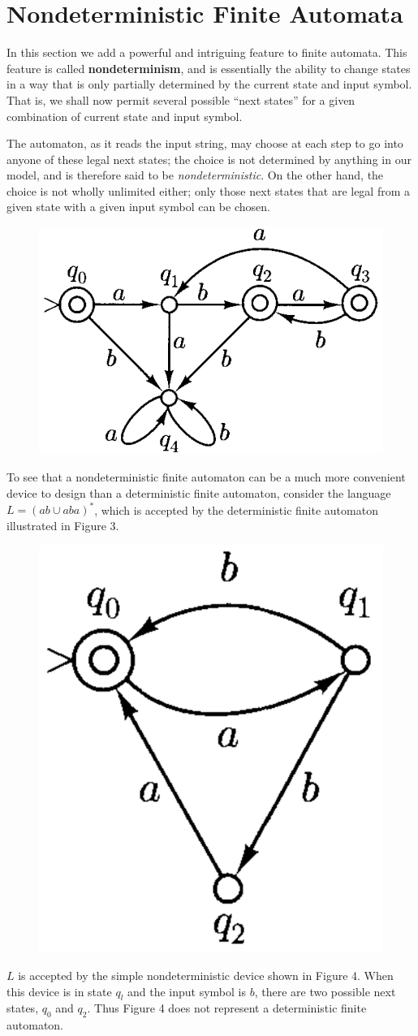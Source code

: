 \section{Nondeterministic Finite Automata}

In this section we add a powerful and intriguing feature to finite automata.
This feature is called \textbf{nondeterminism}, and is essentially the ability to change states in a way that is only partially determined by the current state and input symbol. That is, we shall now permit several possible ``next states'' for a given combination of current state and input symbol. 

The automaton, as it reads the input string, may choose at each step to go into anyone of these legal next states; the choice is not determined by anything in our model, and is therefore said to be \textit{nondeterministic}. On the other hand, the choice is not wholly unlimited either; only those next states that are legal from a given state with a given input symbol can be chosen. 

\newpage

\begin{figure}[ht!]
  \centering
  \includegraphics[width=.3\textwidth]{img/Fig2.4.png}
  \caption{}
\end{figure}

To see that a nondeterministic finite automaton can be a much more convenient device to design than a deterministic finite automaton, consider the language $L = (ab \cup aba)^*$, which is accepted by the deterministic finite automaton illustrated in Figure 3.

\begin{figure}[ht!]
  \centering
  \includegraphics[width=.2\textwidth]{img/Fig2.5.png}
  \caption{}
\end{figure}

$L$ is accepted by the simple nondeterministic device shown in Figure 4. When this device is in state $q_l$ and the input symbol is $b$, there are two possible next states, $q_0$ and $q_2$. Thus Figure 4 does not represent a deterministic finite automaton.

